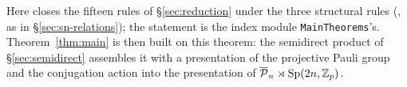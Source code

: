 \noindent Here  closes the fifteen rules
 of \S\ref{sec:reduction} under the three
structural rules (, as in \S\ref{sec:sn-relations});
the statement is the index module \texttt{MainTheorems}'s.
Theorem~\ref{thm:main} is then built on
this theorem: the semidirect product of \S\ref{sec:semidirect}
assembles it with a presentation of the projective Pauli group and the
conjugation action into the presentation of $\overline{\mathcal{P}}_{n} \rtimes \mathrm{Sp}(2n,\mathbb{Z}_p)$.
